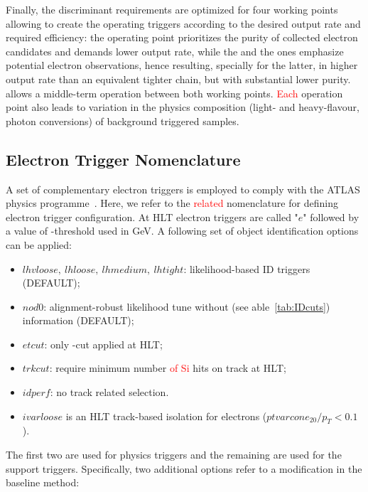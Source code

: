Finally, the discriminant requirements are optimized for four working points
allowing to create the operating triggers according to the desired output rate
and required efficiency: the \tight{} operating point prioritizes the purity of
collected electron candidates and demands lower output rate, while the \loose{}
and the \vloose{} ones emphasize potential electron observations, hence
resulting, specially for the latter, in higher output rate than an equivalent
tighter chain, but with substantial lower purity.  \medium{} allows a middle-term
operation between both working points. \textcolor{red}{Each} operation point also leads to
variation in the physics composition (light- and heavy-flavour, photon
conversions) of background triggered samples. 



\subsection{Electron Trigger Nomenclature}%
\label{ssec:menu}

A set of complementary electron triggers is employed to comply with the ATLAS
physics programme~\cite{aad2020performance}. Here, we refer to the \textcolor{red}{related} nomenclature for
defining electron trigger configuration.  At HLT electron triggers are called
"$e$" followed by a value of \et-threshold used in GeV. A following set of
object identification options can be applied:



\begin{itemize}
\item $lhvloose,~lhloose,~lhmedium,~lhtight$: likelihood-based ID triggers (DEFAULT);
\item $nod0$: alignment-robust likelihood tune without \trackdO (see able~\ref{tab:IDcuts}) information (DEFAULT);
\item $etcut$: only \et-cut applied at HLT;
\item $trkcut$: require minimum number \textcolor{red}{of Si} hits on track at HLT;
\item $idperf$: no track related selection.
\item $ivarloose$ is an HLT track-based isolation for electrons ($ptvarcone_{20}/p_T<0.1$).
\end{itemize}




The first two are used for physics triggers and the remaining are used
for the support triggers. Specifically, two additional options refer to
a modification in the \fastcalo{} baseline method:

